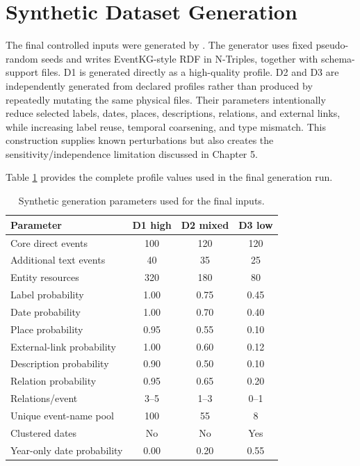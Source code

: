 \section{Synthetic Dataset Generation}

The final controlled inputs were generated by . The generator uses fixed pseudo-random seeds and writes EventKG-style RDF in N-Triples, together with schema-support files. D1 is generated directly as a high-quality profile. D2 and D3 are independently generated from declared profiles rather than produced by repeatedly mutating the same physical files. Their parameters intentionally reduce selected labels, dates, places, descriptions, relations, and external links, while increasing label reuse, temporal coarsening, and type mismatch. This construction supplies known perturbations but also creates the sensitivity/independence limitation discussed in Chapter 5.

Table \ref{tab:appendix_synthetic_generation_parameters} provides the complete profile values used in the final generation run.

\begin{table}[htbp]
\centering
\scriptsize
\caption{Synthetic generation parameters used for the final inputs.}
\label{tab:appendix_synthetic_generation_parameters}
\begin{tabular}{lccc}
\toprule
Parameter & D1 high & D2 mixed & D3 low \\
\midrule
Core direct events & 100 & 120 & 120 \\
Additional text events & 40 & 35 & 25 \\
Entity resources & 320 & 180 & 80 \\
Label probability & 1.00 & 0.75 & 0.45 \\
Date probability & 1.00 & 0.70 & 0.40 \\
Place probability & 0.95 & 0.55 & 0.10 \\
External-link probability & 1.00 & 0.60 & 0.12 \\
Description probability & 0.90 & 0.50 & 0.10 \\
Relation probability & 0.95 & 0.65 & 0.20 \\
Relations/event & 3--5 & 1--3 & 0--1 \\
Unique event-name pool & 100 & 55 & 8 \\
Clustered dates & No & No & Yes \\
Year-only date probability & 0.00 & 0.20 & 0.55 \\
\bottomrule
\end{tabular}
\end{table}

